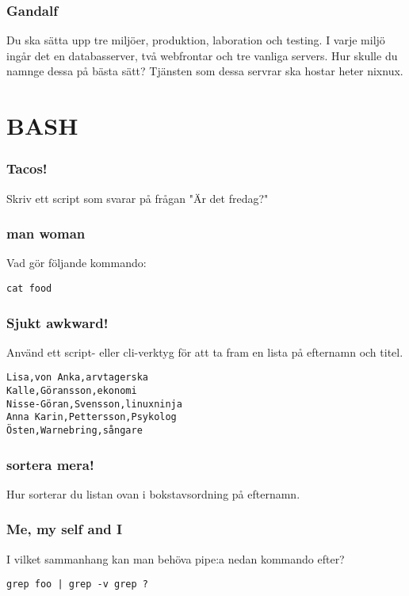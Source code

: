 \documentclass[a4paper]{report}
\begin{document}
\subsubsection{Gandalf}
Du ska sätta upp tre miljöer, produktion, laboration och testing. I varje miljö ingår det en databasserver, två webfrontar och tre vanliga servers. 
Hur skulle du namnge dessa på bästa sätt?
Tjänsten som dessa servrar ska hostar heter nixnux.

\section{BASH}

\subsubsection{Tacos!}
Skriv ett script som svarar på frågan "Är det fredag?"

\subsubsection{man woman}
Vad gör följande kommando:
\begin{verbatim}
cat food
\end{verbatim}

\subsubsection{Sjukt awkward!}
Använd ett script- eller cli-verktyg för att ta fram en lista på efternamn och titel.
\begin{verbatim}
Lisa,von Anka,arvtagerska
Kalle,Göransson,ekonomi
Nisse-Göran,Svensson,linuxninja
Anna Karin,Pettersson,Psykolog
Östen,Warnebring,sångare
\end{verbatim}

\subsubsection{sortera mera!}
Hur sorterar du listan ovan i bokstavsordning på efternamn.

\subsubsection{Me, my self and I}
I vilket sammanhang kan man behöva pipe:a nedan kommando efter?
\begin{verbatim}
grep foo | grep -v grep ?
\end{verbatim}
\end{document}

